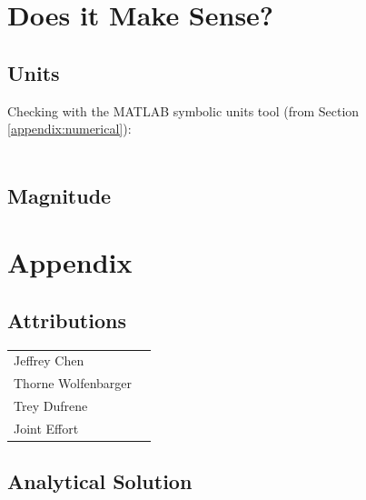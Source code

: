 \documentclass[12pt]{report}
\begin{document}
\begin{flushleft}
\section{Does it Make Sense?}

\subsection{Units}
Checking with the MATLAB symbolic units tool (from Section \ref{appendix:numerical}): \\
~\\
% 
\subsection{Magnitude}

\section{Appendix} \label{appendix}
\subsection{Attributions}
\onehalfspacing
\begin{tabular}{ll}
Jeffrey Chen & \\
Thorne Wolfenbarger & \\
Trey Dufrene & \\
Joint Effort &
\end{tabular}
\singlespacing

\newpage
\subsection{Analytical Solution}

\newpage

\end{flushleft}
\end{document}
